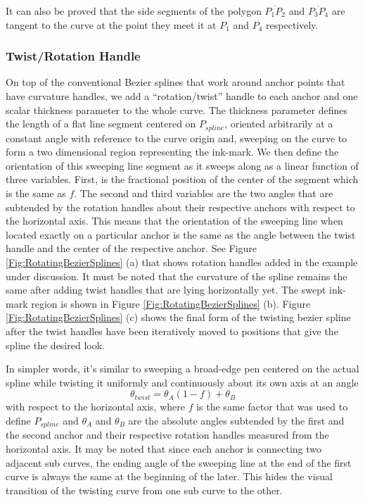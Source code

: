 It can also be proved that the side segments of the polygon $\overline{P_1 P_2}$ and $\overline{P_3 P_4}$ are tangent to the curve at the point they meet it at $P_1$ and $P_4$ respectively.


\subsubsection{Twist/Rotation Handle}
    On top of the conventional Bezier splines that work around anchor points that have curvature handles, we add a ``rotation/twist'' handle to each anchor and one scalar thickness parameter to the whole curve. The thickness parameter defines the length of a flat line segment centered on $P_{spline}$, oriented arbitrarily at a constant angle with reference to the curve origin and, sweeping on the curve to form a two dimensional region representing the ink-mark. We then define the orientation of this sweeping line segment as it sweeps along as a linear function of three variables. First, is the fractional position of the center of the segment which is the same as $f$. The second and third variables are the two angles that are subtended by the rotation handles about their respective anchors with respect to the horizontal axis. This means that the orientation of the sweeping line when located exactly on a particular anchor is the same as the angle between the twist handle and the center of the respective anchor. See Figure \ref{Fig:RotatingBezierSplines} (a) that shows rotation handles added in the example under discussion. It must be noted that the curvature of the spline remains the same after adding twist handles that are lying horizontally yet. The swept ink-mark region is shown in Figure \ref{Fig:RotatingBezierSplines} (b). Figure \ref{Fig:RotatingBezierSplines} (c) shows the final form of the twisting bezier spline after the twist handles have been iteratively moved to positions that give the spline the desired look.


    In simpler words, it’s similar to sweeping a broad-edge pen centered on the actual spline while twisting it uniformly and continuously about its own axis at an angle
    \begin{equation}
    \theta_{twist}=\theta_A  (1-f)+ \theta_B
    \end{equation}
    with respect to the horizontal axis, where $f$ is the same factor that was used to define $P_{spline}$ and $\theta_A$ and $\theta_B$ are the absolute angles subtended by the first and the second anchor and their respective rotation handles measured from the horizontal axis. It may be noted that since each anchor is connecting two adjacent sub curves, the ending angle of the sweeping line at the end of the first curve is always the same at the beginning of the later. This hides the visual transition of the twisting curve from one sub curve to the other.

